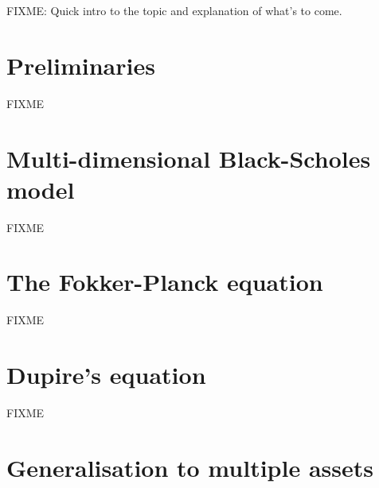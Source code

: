 \documentclass[a4paper]{article}
\begin{document}
FIXME: Quick intro to the topic and explanation of what's to come.

\section{Preliminaries}


FIXME

\section{Multi-dimensional Black-Scholes model}


FIXME

\section{The Fokker-Planck equation}


FIXME

\section{Dupire's equation}


FIXME

\section{Generalisation to multiple assets}

\end{document}

